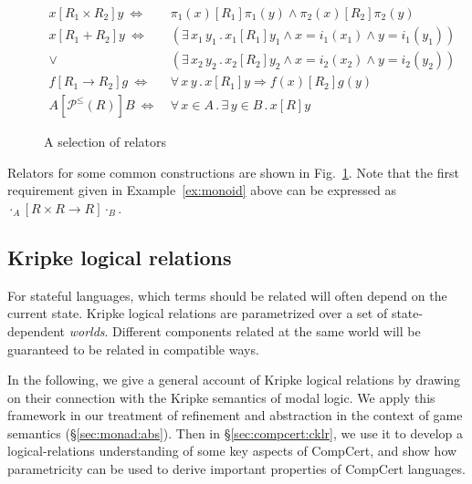 \documentclass[sigplan,10pt,review,anonymous]{acmart}
\newcommand{\ifr}[1]{\mathrel{[{#1}]}}
\begin{document}
\begin{figure} %
  {\small
  \begin{align*}
    x \ifr{R_1 \times R_2} y \ \Leftrightarrow\  &
      \pi_1(x) \ifr{R_1} \pi_1(y) \wedge
      \pi_2(x) \ifr{R_2} \pi_2(y) \\
    x \ifr{R_1 + R_2} y \ \Leftrightarrow\  &
      (\exists \, x_1 \, y_1 \,.\,
        x_1 \ifr{R_1} y_1 \wedge
        x = i_1(x_1) \wedge
        y = i_1(y_1)) \\ \vee\ &
      (\exists \, x_2 \, y_2 \,.\,
        x_2 \ifr{R_2} y_2 \wedge
        x = i_2(x_2) \wedge
        y = i_2(y_2)) \\
    f \ifr{R_1 \rightarrow R_2} g \ \Leftrightarrow\  &
      \forall \, x \, y \,.\,
        x \ifr{R_1} y \Rightarrow
        f(x) \ifr{R_2} g(y) \\
    A \ifr{\mathcal{P}^\le(R)} B \ \Leftrightarrow\  &
      \forall \, x \in A \,.\,
      \exists \, y \in B \,.\,
      x \ifr{R} y
  \end{align*}
  }%
  \caption{A selection of relators}
  \label{fig:relators}
\end{figure}

Relators for some common constructions are shown in Fig.~\ref{fig:relators}.
Note that the first requirement given in Example~\ref{ex:monoid} above
can be expressed as
$
  \cdot_A \ifr{R \times R \rightarrow R} \cdot_B
$.



\subsection{Kripke logical relations} %
\label{sec:klr}

For stateful languages,
which terms should be related
will often depend on the current state.
Kripke logical relations
are parametrized over a set of state-dependent \emph{worlds}.
Different components related at the same world
will be guaranteed to be related in compatible ways.

In the following,
we give a general account of Kripke logical relations
by drawing on their connection with
the Kripke semantics of modal logic.
We apply this framework
in our treatment of refinement and abstraction
in the context of game semantics (\S\ref{sec:monad:abs}).
Then in \S\ref{sec:compcert:cklr},
we use it to develop a logical-relations
understanding of some key aspects of CompCert,
and show how parametricity
can be used to derive important properties
of CompCert languages.
\end{document}
